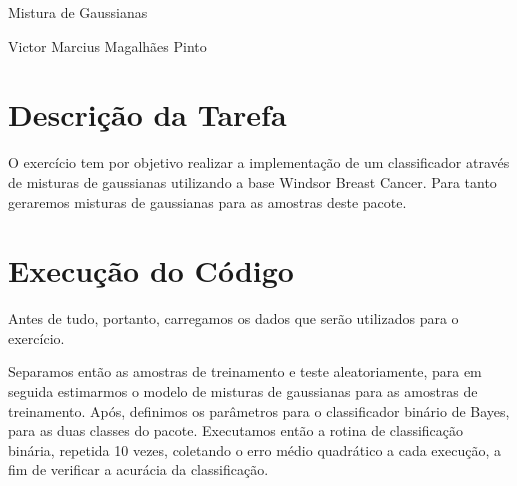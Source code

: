 \documentclass[12pt,a4paper,titlepage]{article}
\begin{document}


\begin{center}
{\huge Mistura de Gaussianas}

{\large Victor Marcius Magalhães Pinto}
\end{center}

\section{Descrição da Tarefa}

O exercício tem por objetivo realizar a implementação de um classificador através de misturas de gaussianas utilizando a base Windsor Breast Cancer. Para tanto geraremos misturas de gaussianas para as amostras deste pacote.



\section{Execução do Código}

Antes de tudo, portanto, carregamos os dados que serão utilizados para o exercício.

\begin{Schunk}
\end{Schunk}

Separamos então as amostras de treinamento e teste aleatoriamente, para em seguida estimarmos o modelo de misturas de gaussianas para as amostras de treinamento. Após, definimos os parâmetros para o classificador binário de Bayes, para as duas classes do pacote. Executamos então a rotina de classificação binária, repetida 10 vezes, coletando o erro médio quadrático a cada execução, a fim de verificar a acurácia da classificação.
\end{document}
